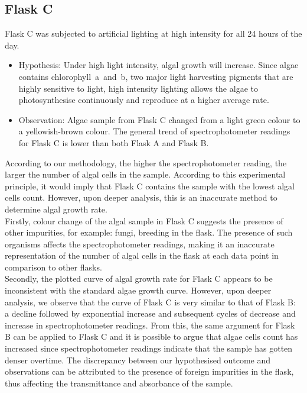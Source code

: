 \documentclass[12pt,a4paper]{IEEEtran}
\begin{document}
    \subsection{Flask C}
    Flask C was subjected to artificial lighting at high intensity for all 24 hours of the day. \\
    
    \begin{itemize}
    	\item Hypothesis: Under high light intensity, algal growth will increase. Since algae contains chlorophyll~a~and~b, two major light harvesting pigments that are highly sensitive to light, high intensity lighting allows the algae to photosynthesise continuously and reproduce at a higher average rate. \\
    	\item Observation: Algae sample from Flask C changed from a light green colour to a yellowish-brown colour. The general trend of spectrophotometer readings for Flask C is lower than both Flask A and Flask B. \\
    \end{itemize}
    According to our methodology, the higher the spectrophotometer reading, the larger the number of algal cells in the sample. According to this experimental principle, it would imply that Flask C contains the sample with the lowest algal cells count. However, upon deeper analysis, this is an inaccurate method to determine algal growth rate. \\
    
    Firstly, colour change of the algal sample in Flask C suggests the presence of other impurities, for example: fungi, breeding in the flask. The presence of such organisms affects the spectrophotometer readings, making it an inaccurate representation of the number of algal cells in the flask at each data point in comparison to other flasks. \\
    
    Secondly, the plotted curve of algal growth rate for Flask C appears to be inconsistent with the standard algae growth curve. However, upon deeper analysis, we observe that the curve of Flask C is very similar to that of Flask B: a decline followed by exponential increase and subsequent cycles of decrease and increase in spectrophotometer readings. From this, the same argument for Flask B can be applied to Flask C and it is possible to argue that algae cells count has increased since spectrophotometer readings indicate that the sample has gotten denser overtime. The discrepancy between our hypothesised outcome and observations can be attributed to the presence of foreign impurities in the flask, thus affecting the transmittance and absorbance of the sample. \\ \vspace{-0.1in}
    
\end{document}
